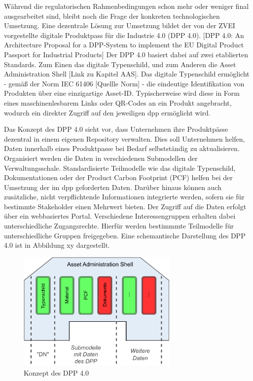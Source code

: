 Während die regulatorischen Rahmenbedingungen schon mehr oder weniger final ausgearbeitet sind, bleibt noch die Frage der konkreten technologischen Umsetzung.
Eine dezentrale Lösung zur Umsetzung bildet der von der ZVEI vorgestellte digitale Produktpass für die Industrie 4.0 (DPP 4.0). [DPP 4.0: An Architecture Proposal for a DPP-System to implement the EU Digital Product Passport for Industrial Products]
Der DPP 4.0 basiert dabei auf zwei etablierten Standards. Zum Einen das digitale Typenschild, und zum Anderen die Asset Administration Shell [Link zu Kapitel AAS].
Das digitale Typenschild ermöglicht - gemäß der Norm IEC 61406 [Quellle Norm] - die eindeutige Identifikation von Produkten über eine einzigartige Asset-ID.
Typischerweise wird diese in Form eines maschinenlesbarem Links oder QR-Codes an ein Produkt angebracht, wodurch ein direkter Zugriff auf den jeweiligen \acs{dpp} ermöglicht wird.

Das Konzept des DPP 4.0 sieht vor, dass Unternehmen ihre Produktpässe dezentral in einem eigenen Repository verwalten.
Dies soll Unternehmen helfen, Daten innerhalb eines Produktpasse bei Bedarf selbstständig zu aktualisieren.
Organisiert werden die Daten in verschiedenen Submodellen der Verwaltungsschale. 
Standardisierte Teilmodelle wie das digitale Typenschild, Dokumentationen oder der Product Carbon Footprint (PCF) helfen bei der Umsetzung der im \acs{dpp} geforderten Daten.
Darüber hinaus können auch zusätzliche, nicht verpflichtende Informationen integrierte werden, sofern sie für bestimmte Stakeholder einen Mehrwert bieten.
Der Zugriff auf die Daten erfolgt über ein webbasiertes Portal. Verschiedene Interessengruppen erhalten dabei unterschiedliche Zugangsrechte. 
Hierfür werden bestimmmte Teilmodelle für unterschiedliche Gruppen freigegeben.
Eine schemantische Darstellung des DPP 4.0 ist in Abbildung xy dargestellt.

\begin{figure}[htbp]
    \centering
    \includegraphics[width=0.7\textwidth]{Bilder/dpp_konzept.pdf}
    \caption{Konzept des DPP 4.0}
    \label{fig:klassifizierungDT}
\end{figure}


